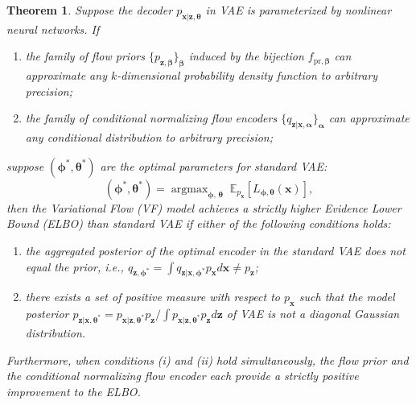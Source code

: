 \documentclass[10pt,a4paper]{amsart}
\newtheorem{thm}{Theorem}
\newcommand{\mb}{\boldsymbol}
\begin{document}
\begin{thm}
\label{thm:vf_elbo_extended}
Suppose the decoder $p_{\mb{x}|\mb{z},\mb{\theta}}$ in VAE is parameterized by nonlinear neural networks. If
\begin{enumerate}
\item[(a)] the family of flow priors $\{p_{\mb{z},\mb{\beta}}\}_{\mb{\beta}}$ induced by the bijection $f_{\mathrm{pr},\boldsymbol{\beta}}$ can approximate any $k$-dimensional probability density function to arbitrary precision;
\item[(b)] the family of conditional normalizing flow encoders $\{q_{\mb{z}|\mb{x},\boldsymbol{\alpha}}\}_{\boldsymbol{\alpha}}$ can approximate any conditional distribution to arbitrary precision;
\end{enumerate}
suppose $(\mb{\phi}^*,\mb{\theta}^*)$ are the optimal parameters for standard VAE:
\begin{equation}
(\mb{\phi}^*,\mb{\theta}^*) = \mathop{\arg\max}_{\mb{\phi},\, \mb{\theta}} \; \mathbb{E}_{p_{\mb{x}}}[L_{\mb{\phi},\mb{\theta}}(\mb{x})],
\end{equation}
then the Variational Flow (VF) model achieves a strictly higher Evidence Lower Bound (ELBO) than standard VAE if either of the following conditions holds:
\begin{enumerate}
\item[(i)] the aggregated posterior of the optimal encoder in the standard VAE does not equal the prior, i.e., $q_{\mb{z},\boldsymbol{\phi}^*}= \int q_{\mb{z}|\mb{x},\mb{\phi}^*} p_{\mb{x}}d\mb{x} \neq p_{\mb{z}}$;
\item[(ii)] there exists a set of positive measure with respect to $p_{\mb{x}}$ such that the model posterior $p_{\mb{z}|\mb{x},\boldsymbol{\theta}^*}=p_{\mb{x}|\mb{z},\mb{\theta}^*}p_{\mb{z}}/ \int p_{\mb{x}|\mb{z},\mb{\theta}^*}p_{\mb{z}}d\mb{z}$ of VAE is not a diagonal Gaussian distribution.
\end{enumerate}
Furthermore, when conditions (i) and (ii) hold simultaneously, the flow prior and the conditional normalizing flow encoder each provide a strictly positive improvement to the ELBO.
\end{thm}
\end{document}
